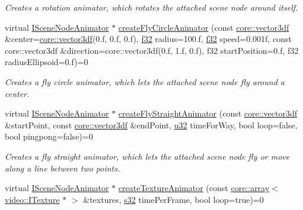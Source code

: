 \begin{DoxyCompactItemize}
\begin{DoxyCompactList}\small\item\em Creates a rotation animator, which rotates the attached scene node around itself. \end{DoxyCompactList}\item 
virtual \hyperlink{classirr_1_1scene_1_1ISceneNodeAnimator}{I\+Scene\+Node\+Animator} $\ast$ \hyperlink{classirr_1_1scene_1_1ISceneManager_a2e49ff49bc9e88e8ecf3d681354e1ab6}{create\+Fly\+Circle\+Animator} (const \hyperlink{namespaceirr_1_1core_a06f169d08b5c429f5575acb7edbad811}{core\+::vector3df} \&center=\hyperlink{namespaceirr_1_1core_a06f169d08b5c429f5575acb7edbad811}{core\+::vector3df}(0.f, 0.f, 0.f), \hyperlink{namespaceirr_a0277be98d67dc26ff93b1a6a1d086b07}{f32} radius=100.f, \hyperlink{namespaceirr_a0277be98d67dc26ff93b1a6a1d086b07}{f32} speed=0.\+001f, const core\+::vector3df \&direction=core\+::vector3df(0.\+f, 1.\+f, 0.\+f), f32 start\+Position=0.\+f, f32 radius\+Ellipsoid=0.\+f)=0
\begin{DoxyCompactList}\small\item\em Creates a fly circle animator, which lets the attached scene node fly around a center. \end{DoxyCompactList}\item 
virtual \hyperlink{classirr_1_1scene_1_1ISceneNodeAnimator}{I\+Scene\+Node\+Animator} $\ast$ \hyperlink{classirr_1_1scene_1_1ISceneManager_a865c2da86486dcdb44847d5baa7aaa61}{create\+Fly\+Straight\+Animator} (const \hyperlink{namespaceirr_1_1core_a06f169d08b5c429f5575acb7edbad811}{core\+::vector3df} \&start\+Point, const \hyperlink{namespaceirr_1_1core_a06f169d08b5c429f5575acb7edbad811}{core\+::vector3df} \&end\+Point, \hyperlink{namespaceirr_a0416a53257075833e7002efd0a18e804}{u32} time\+For\+Way, bool loop=false, bool pingpong=false)=0
\begin{DoxyCompactList}\small\item\em Creates a fly straight animator, which lets the attached scene node fly or move along a line between two points. \end{DoxyCompactList}\item 
virtual \hyperlink{classirr_1_1scene_1_1ISceneNodeAnimator}{I\+Scene\+Node\+Animator} $\ast$ \hyperlink{classirr_1_1scene_1_1ISceneManager_ae212e01dffc4891d32e3d1735d22d04a}{create\+Texture\+Animator} (const \hyperlink{classirr_1_1core_1_1array}{core\+::array}$<$ \hyperlink{classirr_1_1video_1_1ITexture}{video\+::\+I\+Texture} $\ast$ $>$ \&textures, \hyperlink{namespaceirr_ac66849b7a6ed16e30ebede579f9b47c6}{s32} time\+Per\+Frame, bool loop=true)=0

\end{DoxyCompactItemize}
